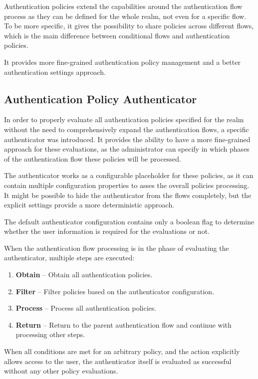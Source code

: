 Authentication policies extend the capabilities around the authentication flow process as they can be defined for the whole realm, not even for a specific flow.
To be more specific, it gives the possibility to share policies across different flows, which is the main difference between conditional flows and authentication policies.

It provides more fine-grained authentication policy management and a better authentication settings approach.

\subsection{Authentication Policy Authenticator}
In order to properly evaluate all authentication policies specified for the realm without the need to comprehensively expand the authentication flows, a specific authenticator was introduced.
It provides the ability to have a more fine-grained approach for these evaluations, as the administrator can specify in which phases of the authentication flow these policies will be processed.

The authenticator works as a configurable placeholder for these policies, as it can contain multiple configuration properties to asses the overall policies processing.
It might be possible to hide the authenticator from the flows completely, but the explicit settings provide a more deterministic approach.

The default authenticator configuration contains only a boolean flag to determine whether the user information is required for the evaluations or not.

When the authentication flow processing is in the phase of evaluating the authenticator, multiple steps are executed:

\begin{enumerate}
    \item \textbf{Obtain} -- Obtain all authentication policies.
    \item \textbf{Filter} -- Filter policies based on the authenticator configuration.
    \item \textbf{Process} -- Process all authentication policies.
    \item \textbf{Return} -- Return to the parent authentication flow and continue with processing other steps.
\end{enumerate}

When all conditions are met for an arbitrary policy, and the action explicitly allows access to the user, the authenticator itself is evaluated as successful without any other policy evaluations.

